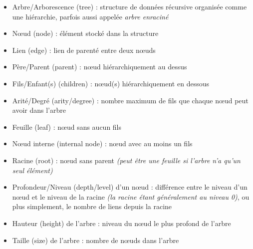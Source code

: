 \documentclass[11pt,a4paper]{article}
\begin{document}
\begin{itemize}
\item Arbre/Arborescence (tree) : structure de données récursive organisée comme une hiérarchie, parfois aussi appelée \textit{arbre enraciné}
\item Nœud (node) : élément stocké dans la structure
\item Lien (edge) : lien de parenté entre deux nœuds

\bigskip

\item Père/Parent (parent) : nœud hiérarchiquement au dessus
\item Fils/Enfant(s) (children) : nœud(s) hiérarchiquement en dessous
\item Arité/Degré (arity/degree) : nombre maximum de fils que chaque nœud peut avoir dans l'arbre

\bigskip

\item Feuille (leaf) : nœud sans aucun fils
\item Nœud interne (internal node) : nœud avec au moins un fils
\item Racine (root) : nœud sans parent \textit{(peut être une feuille si l'arbre n'a qu'un seul élément)}

\bigskip

\item Profondeur/Niveau (depth/level) d'un nœud : différence entre le niveau d'un nœud et le niveau de la racine \textit{(la racine étant généralement au niveau 0)}, ou plus simplement, le nombre de liens depuis la racine
\item Hauteur (height) de l'arbre : niveau du nœud le plus profond de l'arbre
\item Taille (size) de l'arbre : nombre de nœuds dans l'arbre
\end{itemize}



\pagebreak
\end{document}
